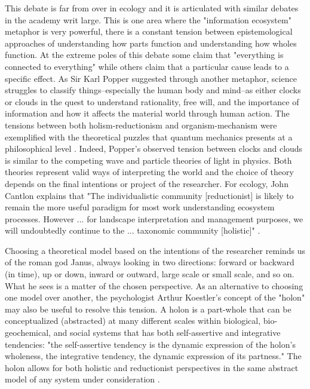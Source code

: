 This debate is far from over in ecology and it is articulated with similar debates in the academy writ large. This is one area where the "information ecosystem" metaphor is very powerful, there is a constant tension between epistemological approaches of understanding how parts function and understanding how wholes function. At the extreme poles of this debate some claim that "everything is connected to everything" \citep{commoner_1971} while others claim that a particular cause leads to a specific effect. As Sir Karl Popper suggested through another metaphor, science struggles to classify things--especially the human body and mind--as either clocks or clouds in the quest to understand rationality, free will, and the importance of information and how it affects the material world through human action. The tensions between both holism-reductionism and organism-mechanism were exemplified with the theoretical puzzles that quantum mechanics presents at a philosophical level \citep{popper_1966}. Indeed, Popper's observed tension between clocks and clouds is similar to the competing wave and particle theories of light in physics. Both theories represent valid ways of interpreting the world and the choice of theory depends on the final intentions or project of the researcher. For ecology, John Cantlon explains that "The individualistic community [reductionist] is likely to remain the more useful paradigm for most work understanding ecosystem processes. However ... for landscape interpretation and management purposes, we will undoubtedly continue to the ... taxonomic community [holistic]" \citep[Cantlon 1996, cited in ][p. 241]{barbour_1996}. 

Choosing a theoretical model based on the intentions of the researcher reminds us of the roman god Janus, always looking in two directions: forward or backward (in time), up or down, inward or outward, large scale or small scale, and so on. What he sees is a matter of the chosen perspective. As an alternative to choosing one model over another, the psychologist Arthur Koestler's concept of the "holon" may also be useful to resolve this tension. A holon is a part-whole that can be conceptualized (abstracted) at many different scales within biological, bio-geochemical, and social systems that has both self-assertive and integrative tendencies: "the self-assertive tendency is the dynamic expression of the holon's wholeness, the integrative tendency, the dynamic expression of its partness." The holon allows for both holistic and reductionist perspectives in the same abstract model of any system under consideration \citep[][p. 56] {koestler_1967}.

